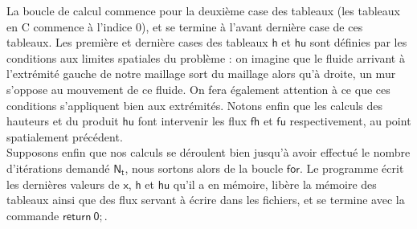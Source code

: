 \documentclass[french]{article}
\newcommand{\xhhu}{$\mathsf{x}$, $\mathsf{h}$ et $\mathsf{hu}$}
\newcommand{\hhu}{$\mathsf{h}$ et $\mathsf{hu}$}
\begin{document}
 La boucle de calcul commence pour la deuxième case des tableaux (les tableaux en C commence à l'indice 0), et se termine à l'avant dernière case de ces tableaux. Les première et dernière cases des tableaux \hhu $ $ sont définies par les conditions aux limites spatiales du problème : on imagine que le fluide arrivant à l'extrémité gauche de notre maillage sort du maillage alors qu'à droite, un mur s'oppose au mouvement de ce fluide. On fera également attention à ce que ces conditions s'appliquent bien aux extrémités. Notons enfin que les calculs des hauteurs et du produit $\mathsf{hu}$ font intervenir les flux $\mathsf{fh}$ et $\mathsf{fu}$ respectivement, au point spatialement précédent. \\

 Supposons enfin que nos calculs se déroulent bien jusqu'à avoir effectué le nombre d'itérations demandé $\mathsf{N_t}$, nous sortons alors de la boucle $\mathsf{for}$. Le programme écrit les dernières valeurs de \xhhu $ $ qu'il a en mémoire, libère la mémoire des tableaux ainsi que des flux servant à écrire dans les fichiers, et se termine avec la commande $\mathsf{return \ 0;}$.\\
 
\thispagestyle{fancy} 
 
\pagebreak 
\end{document}

